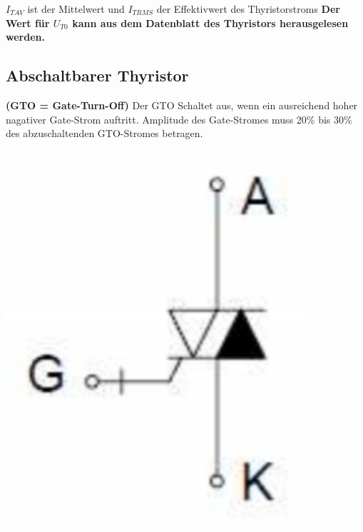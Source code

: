  $I_{T AV}$ ist der Mittelwert und $I_{T RMS}$ der Effektivwert des Thyristorstroms\newline
\textbf{Der Wert für $U_{T0}$ kann aus dem Datenblatt des Thyristors herausgelesen werden.}

\begin{minipage}{0.5\linewidth}
    \subsection{Abschaltbarer Thyristor}
    \begin{minipage}{0.7\linewidth}        
        \textbf{(GTO = Gate-Turn-Off)}\newline
        Der GTO Schaltet aus, wenn ein ausreichend hoher nagativer Gate-Strom auftritt.\newline
        Amplitude des Gate-Stromes muss 20\% bis 30\% des abzuschaltenden GTO-Stromes betragen.
    \end{minipage}
    \begin{minipage}{0.2\linewidth}
        \includegraphics[width=\linewidth]{images/GTOSymbol}
    \end{minipage}    
\end{minipage}
